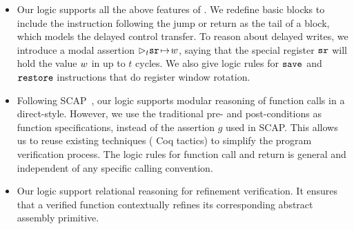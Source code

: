 
\begin{itemize}
	\item
    Our logic supports all the above features of \sparc.
    We redefine basic blocks to include the instruction
    following the jump or return as the tail of a
    block, which models the delayed control
    transfer. To reason about delayed writes, we introduce
    a modal assertion $\rhd_{t}{\texttt{sr}} \!\mapsto\! {w}$, saying that
    the special register $\texttt{sr}$ will
    hold the value $w$ in up to $t$ cycles.
    We also give
    logic rules for $\texttt{save}$ and $\texttt{restore}$ instructions
    that do register window rotation.
%
%
	
	\item
    Following SCAP~\cite{Feng06pldi}, our logic supports
    modular reasoning of function calls in a direct-style.
    However,
    we use the traditional pre- and post-conditions as function
    specifications, instead of the assertion $g$ used
    in SCAP. This allows us to reuse existing techniques
    (\eg{} Coq tactics) to simplify the program
    verification process.
    The logic rules for function call and return is general
    and independent of any specific calling convention.
    \item     
    Our logic support relational reasoning for 
    refinement verification. 
    It ensures that a verified \sparc{} function 
    contextually refines its corresponding 
    abstract assembly primitive.  


\end{itemize}
